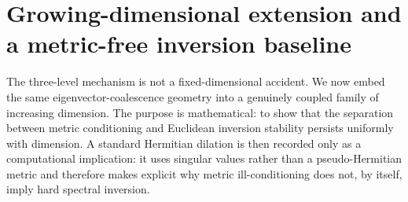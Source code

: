 \section{Growing-dimensional extension and a metric-free inversion baseline}
\label{sec:scalable}
The three-level mechanism is not a fixed-dimensional accident.  We now embed the same
eigenvector-coalescence geometry into a genuinely coupled family of increasing dimension.
The purpose is mathematical: to show that the separation between metric conditioning and
Euclidean inversion stability persists uniformly with dimension.  A standard Hermitian
dilation is then recorded only as a computational implication: it uses singular values rather
than a pseudo-Hermitian metric and therefore makes explicit why metric ill-conditioning does
not, by itself, imply hard spectral inversion.

